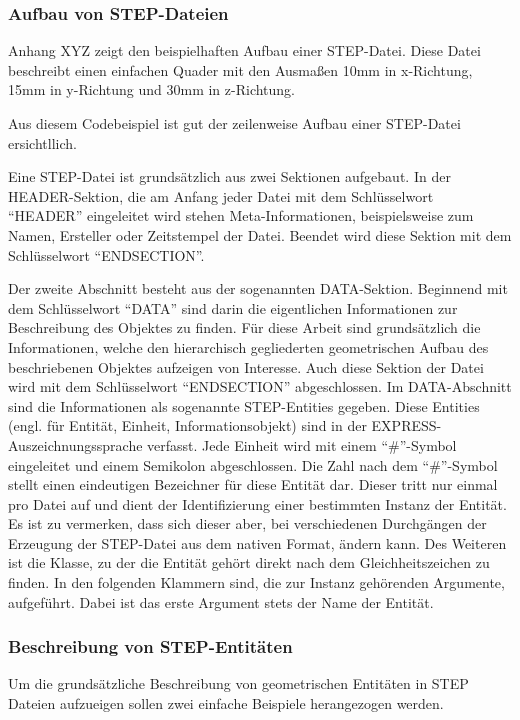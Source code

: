 \subsubsection{Aufbau von STEP-Dateien}

Anhang XYZ zeigt den beispielhaften Aufbau einer STEP-Datei. Diese Datei beschreibt einen einfachen Quader mit den Ausmaßen 10mm in x-Richtung, 15mm in y-Richtung und 30mm in z-Richtung. 

Aus diesem Codebeispiel ist gut der zeilenweise Aufbau einer STEP-Datei ersichtllich. 

Eine STEP-Datei ist grundsätzlich aus zwei Sektionen aufgebaut. 
In der HEADER-Sektion, die am Anfang jeder Datei mit dem Schlüsselwort "`HEADER"' eingeleitet wird stehen Meta-Informationen, beispielsweise zum Namen, Ersteller oder Zeitstempel der Datei. Beendet wird diese Sektion mit dem Schlüsselwort "`ENDSECTION"'.

Der zweite Abschnitt besteht aus der sogenannten DATA-Sektion. Beginnend mit dem Schlüsselwort "`DATA"' sind darin die eigentlichen Informationen zur Beschreibung des Objektes zu finden. Für diese Arbeit sind grundsätzlich die Informationen, welche den hierarchisch gegliederten geometrischen Aufbau des beschriebenen Objektes aufzeigen von Interesse. Auch diese Sektion der Datei wird mit dem Schlüsselwort "`ENDSECTION"' abgeschlossen. Im DATA-Abschnitt sind die Informationen als sogenannte STEP-Entities gegeben. Diese Entities (engl. für Entität, Einheit, Informationsobjekt) sind in der EXPRESS-Auszeichnungssprache verfasst. Jede Einheit wird mit einem "`\#"'-Symbol eingeleitet und einem Semikolon abgeschlossen. Die Zahl nach dem "`\#"'-Symbol stellt einen eindeutigen Bezeichner für diese Entität dar. Dieser tritt nur einmal pro Datei auf und dient der Identifizierung einer bestimmten Instanz der Entität. Es ist zu vermerken, dass sich dieser aber, bei verschiedenen Durchgängen der Erzeugung der STEP-Datei aus dem nativen Format, ändern kann.
Des Weiteren ist die Klasse, zu der die Entität gehört direkt nach dem Gleichheitszeichen zu finden. In den folgenden Klammern sind, die zur Instanz gehörenden Argumente, aufgeführt. Dabei ist das erste Argument stets der Name der Entität. 

\subsubsection{Beschreibung von STEP-Entitäten}

Um die grundsätzliche Beschreibung von geometrischen Entitäten in STEP Dateien aufzueigen sollen zwei einfache Beispiele herangezogen werden.

